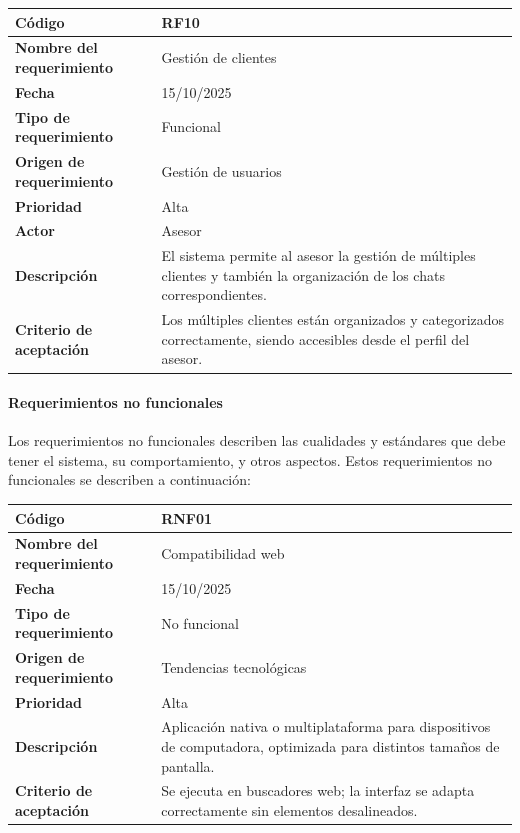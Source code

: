\begin{table}[H]
	\begin{tabular}{|a{5cm}|m{11cm}|}
		\hline
		\textbf{Código} & RF10 \\ \hline
		\textbf{Nombre del requerimiento} & Gestión de clientes \\ \hline
		\textbf{Fecha} & 15/10/2025 \\ \hline
		\textbf{Tipo de requerimiento} & Funcional \\ \hline
		\textbf{Origen de requerimiento} & Gestión de usuarios \\ \hline
		\textbf{Prioridad} & Alta \\ \hline
		\textbf{Actor} & Asesor \\ \hline
		\textbf{Descripción} & El sistema permite al asesor la gestión de múltiples clientes y también la organización de los chats correspondientes. \\ \hline
		\textbf{Criterio de aceptación} & Los múltiples clientes están organizados y categorizados correctamente, siendo accesibles desde el perfil del asesor. \\ \hline
	\end{tabular}
\end{table}

\paragraph*{Requerimientos no funcionales}
Los requerimientos no funcionales describen las cualidades y estándares que debe tener el sistema, su comportamiento, y otros aspectos. Estos requerimientos no funcionales se describen a continuación:

\begin{table}[H]
	\begin{tabular}{|s{5cm}|m{11cm}|}
		\hline
		\textbf{Código} & RNF01 \\ \hline
		\textbf{Nombre del requerimiento} & Compatibilidad web \\ \hline
		\textbf{Fecha} & 15/10/2025 \\ \hline
		\textbf{Tipo de requerimiento} & No funcional \\ \hline
		\textbf{Origen de requerimiento} & Tendencias tecnológicas \\ \hline
		\textbf{Prioridad} & Alta \\ \hline
		\textbf{Descripción} & Aplicación nativa o multiplataforma para dispositivos de computadora, optimizada para distintos tamaños de pantalla. \\ \hline
		\textbf{Criterio de aceptación} & Se ejecuta en buscadores web; la interfaz se adapta correctamente sin elementos desalineados. \\ \hline
	\end{tabular}
\end{table}

